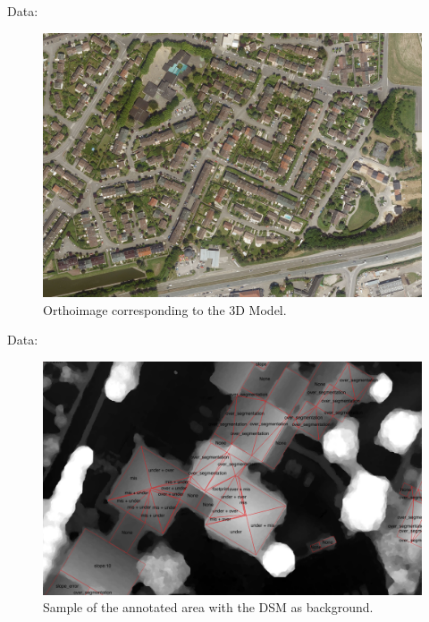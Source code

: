 \documentclass[9pt]{beamer}
\begin{document}
	\begin{frame}{Data:}
		\begin{figure}
			\begin{center}
				\caption{\label{img::ortho} Orthoimage corresponding to the 3D Model.}
				\includegraphics[scale=.08]{orthoimage.jpg}
			\end{center}
		\end{figure}
	\end{frame}

	\begin{frame}{Data:}
		\begin{figure}
			\begin{center}
				\caption{\label{img::annotation} Sample of the annotated area with the DSM as background.}
				\includegraphics[scale=.25]{errors_sample.png}
			\end{center}
		\end{figure}
	\end{frame}
	
\end{document}
